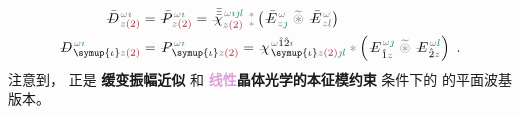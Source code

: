 \begin{subequations} \label{eq:DP^(2)-plane_wave_basis-p_pp}
\begin{align}
	\Xint{\mathcolor{gray}{-}}{30}{\bar{D}}^{\;\! \mathcolor{gray}{\omega} \textcolor{PineGreen}{\imath}}_{\;\! \mathcolor{gray}{z} \textcolor{Maroon}{(2)}} &= \Xint{\mathcolor{gray}{-}}{30}{\bar{P}}^{\;\! \mathcolor{gray}{\omega} \textcolor{PineGreen}{\imath}}_{\;\! \mathcolor{gray}{z} \textcolor{Maroon}{(2)}} = \Xint{{}^{}_{\mathcolor{gray}{-}}}{23}{\bar{\bar{\bar{\chi}}}}^{\;\! \mathcolor{gray}{\omega} \textcolor{PineGreen}{\imath \jmath l}}_{\mathcolor{gray}{z} \textcolor{Maroon}{(2)}} ~{}^{\mathcolor{gray}{*}}_{\mathcolor{gray}{*}} \left( \Xint{\mathcolor{gray}{-}}{295}{\bar{E}}^{\;\!\mathcolor{gray}{\omega}}_{\;\! \mathcolor{gray}{z} \textcolor{PineGreen}{\jmath} } ~\mathcolor{gray}{\widetilde \circledast}~ \Xint{\mathcolor{gray}{-}}{295}{\bar{E}}^{\;\!\mathcolor{gray}{\omega}}_{\;\! \mathcolor{gray}{z} \textcolor{PineGreen}{l} } \right) \label{eq:vec-DP^(2)-plane_wave_basis-p_pp} \\
	\Xint{\mathcolor{gray}{-}}{30}{D}^{\;\! \mathcolor{gray}{\omega} \textcolor{PineGreen}{\imath}}_{\;\! \symup{\iota}\mathcolor{gray}{z} \textcolor{Maroon}{(2)}} &= \Xint{\mathcolor{gray}{-}}{30}{P}^{\;\! \mathcolor{gray}{\omega} \textcolor{PineGreen}{\imath}}_{\;\! \symup{\iota}\mathcolor{gray}{z} \textcolor{Maroon}{(2)}} = \Xint{{}^{}_{\mathcolor{gray}{-}}}{23}{\chi}^{\;\! \mathcolor{gray}{\omega} \hat{1} \hat{2} \textcolor{PineGreen}{\imath}}_{\;\! \symup{\iota} \mathcolor{gray}{z} \textcolor{Maroon}{(2)} \textcolor{PineGreen}{\jmath l}} \mathcolor{gray}{*} \left( \Xint{\mathcolor{gray}{-}}{295}{E}^{\;\!\mathcolor{gray}{\omega} \textcolor{PineGreen}{\jmath}}_{\;\! \hat{1} \mathcolor{gray}{z}} ~\mathcolor{gray}{\widetilde \circledast}~ \Xint{\mathcolor{gray}{-}}{295}{E}^{\;\!\mathcolor{gray}{\omega} \textcolor{PineGreen}{l}}_{\;\! \hat{2} \mathcolor{gray}{z}} \right) ~. \label{eq:components-DP^(2)-plane_wave_basis-p_pp}
\end{align}
\end{subequations}
注意到， 正是 \textbf{\textcolor{NavyBlue}{缓变振幅}近似} 和 \textbf{\textcolor{Plum}{线性}\textcolor{PineGreen}{晶体光学}的\textcolor{PineGreen}{本征模}约束}  条件下的  的\textcolor{PineGreen}{平面波基}版本。

